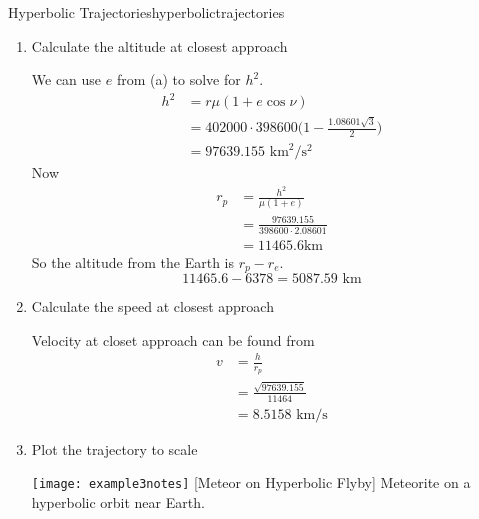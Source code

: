 \begin{examples}{Hyperbolic Trajectories}{hyperbolictrajectories}
\begin{enumerate}[label = (\alph*)]
\begin{align*}
      5.31413\times 10^{10}(e^2 - 1)
      & = 1.60237\times 10^{11}\biggl(1 - \frac{e\sqrt{3}}{2}\biggr)\\
      e^2 - 1 & = 3.0153 - \frac{3.01533e\sqrt{3}}{2}\\
      e^2 + 2.61133e - 4.0153 & = 0\\
      e & = \frac{-2.61133\pm\sqrt{2.61133^2 + 4\cdot 4.0153}}{2}\\
      e & = -3.69731, 1.08601
    \end{align*}
    Since \(e \geq 0\), the eccentricity of the orbit is \(e = 1.08601\).
  \item
    Calculate the altitude at closest approach
    \par\smallskip
    We can use \(e\) from (a) to solve for \(h^2\).
    \begin{align*} 
      h^2 & = r\mu(1 + e\cos\nu)\\
          & = 402000\cdot 398600\biggl(1 - \frac{1.08601\sqrt{3}}{2}\biggr)\\
          & = 97639.155\text{ km}^2/\text{s}^2\
    \end{align*}
    Now
    \begin{align*} 
      r_p & = \frac{h^2}{\mu(1 + e)}\\
          & = \frac{97639.155}{398600\cdot 2.08601}\\
          & = 11465.6\text{km}
    \end{align*}
    So the altitude from the Earth is \(r_p - r_e\).
    \[
    11465.6 - 6378 = 5087.59\text{ km}
    \]
  \item
    Calculate the speed at closest approach
    \par\smallskip
    Velocity at closet approach can be found from
    \begin{align*} 
      v & = \frac{h}{r_p}\\
        & = \frac{\sqrt{97639.155}}{11464}\\
        & = 8.5158\text{ km}/\text{s}
    \end{align*}
  \item
    Plot the trajectory to scale
    \par\smallskip
    \begin{minipage}{\linewidth}
      \centering
      \texttt{[image: example3notes]}
      [Meteor on Hyperbolic Flyby]
      {Meteorite on a hyperbolic orbit near Earth.}
      \label{hyperbolicnearearth}
    \end{minipage}

\end{enumerate}
\end{examples}
